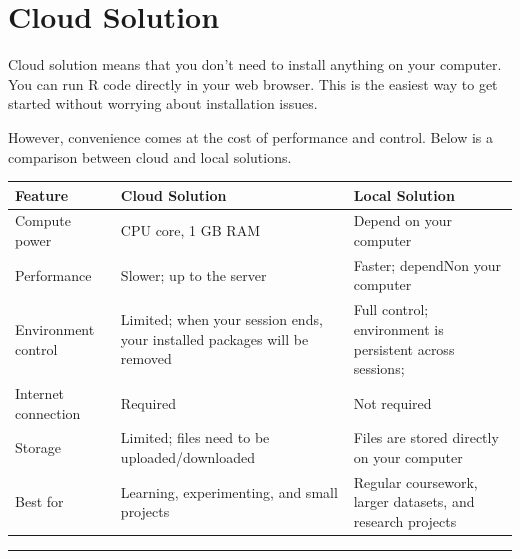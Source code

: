 \documentclass[
  12pt,
  letterpaper,
]{scrbook}
\theoremstyle{plain}
\theoremstyle{definition}
\theoremstyle{remark}
\begin{document}
\section{Cloud Solution}\label{cloud-solution}

Cloud solution means that you don't need to install anything on your
computer. You can run R code directly in your web browser. This is the
easiest way to get started without worrying about installation issues.

However, convenience comes at the cost of performance and control. Below
is a comparison between cloud and local solutions.

\begin{longtable}[]{@{}
  >{\raggedright\arraybackslash}p{}
  >{\raggedright\arraybackslash}p{}
  >{\raggedright\arraybackslash}p{}@{}}
\toprule\noalign{}
\begin{minipage}[b]{\linewidth}\raggedright
Feature
\end{minipage} & \begin{minipage}[b]{\linewidth}\raggedright
Cloud Solution
\end{minipage} & \begin{minipage}[b]{\linewidth}\raggedright
Local Solution
\end{minipage} \\
\midrule\noalign{}
\endhead
\bottomrule\noalign{}
\endlastfoot
Compute power & 1 CPU core, 1 GB RAM & Depend on your computer \\
Performance & Slower; up to the server & Faster; dependNon your
computer \\
Environment control & Limited; when your session ends, your installed
packages will be removed & Full control; environment is persistent
across sessions; \\
Internet connection & Required & Not required \\
Storage & Limited; files need to be uploaded/downloaded & Files are
stored directly on your computer \\
Best for & Learning, experimenting, and small projects & Regular
coursework, larger datasets, and research projects \\
\end{longtable}

\begin{center}\rule{0.5\linewidth}{0.5pt}\end{center}
\end{document}
